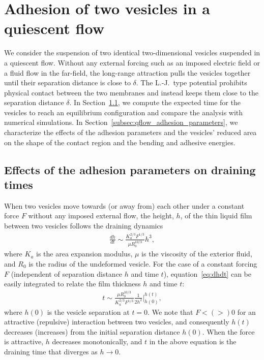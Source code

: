 \documentclass[prf,superscriptaddress,showpacs]{revtex4-1}
\begin{document}
\section{Adhesion of two vesicles in a quiescent flow} 
\label{sec:qflow} 
We consider the suspension of two identical two-dimensional vesicles
suspended in a quiescent flow.  Without any external forcing such as an
imposed electric field or a fluid flow in the far-field, the long-range
attraction pulls the vesicles together until their separation distance
is close to $\delta$. The L.-J.~type potential prohibits physical
contact between the two membranes and instead keeps them close to the
separation distance $\delta$.  In
Section~\ref{subsec:qflow_draining_times}, we compute the expected time
for the vesicles to reach an equilibrium configuration and compare the
analysis with numerical simulations.  In
Section~\ref{subsec:qflow_adhesion_parameters}, we characterize the
effects of the adhesion parameters and the vesicles' reduced area on the
shape of the contact region and the bending and adhesive energies.

\subsection{Effects of the adhesion parameters on draining times}
\label{subsec:qflow_draining_times}
When two vesicles move towards (or away from) each other under a
constant force $F$ without any imposed external flow, the height, $h$, of
the thin liquid film between two vesicles follows the draining
dynamics~\cite{RamachandranLeal2010_PoF}
\begin{align}
  \label{eq:dhdt}
  \frac{d h}{dt} \sim \frac{K_a^{2/3} F^{1/3}}{\mu R_0^{10/3}} h^3,
\end{align}
where $K_a$ is the area expansion modulus, $\mu$ is the viscosity of the
exterior fluid, and $R_0$ is the radius of the undeformed vesicle.  For
the case of a constant forcing $F$ (independent of separation distance
$h$ and time $t$), equation~\eqref{eq:dhdt} can be easily integrated to
relate the film thickness $h$ and time $t$:
\begin{align*}
  t \sim \frac{\mu R_0^{10/3}}{K_a^{2/3} F^{1/3}}
    \frac{1}{2 h^2} \bigg|^{h(t)}_{h(0)},
\end{align*}
where $h(0)$ is the vesicle separation at $t=0$.  We note that $F< (>)
0$ for an attractive  (repulsive) interaction between two vesicles,  and
consequently $h(t)$ decreases (increases) from  the initial separation
distance $h(0)$.  When the force is attractive, $h$ decreases
monotonically, and $t$ in the above equation is the draining time that
diverges as $h\rightarrow 0$.
\end{document}
